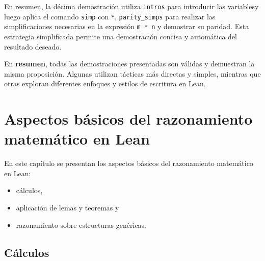 En resumen, la décima demostración utiliza \texttt{intros} para introducir las
variablesy luego aplica el comando \texttt{simp} con \texttt{*}, \texttt{parity\_simps} para
realizar las simplificaciones necesarias en la expresión \texttt{m * n} y
demostrar su paridad. Esta estrategia simplificada permite una
demostración concisa y automática del resultado deseado.

En \textbf{resumen}, todas las demostraciones presentadas son válidas y
demuestran la misma proposición. Algunas utilizan tácticas más directas
y simples, mientras que otras exploran diferentes enfoques y estilos de
escritura en Lean.

\chapter{Aspectos básicos del razonamiento matemático en Lean}
\label{sec:org2d4e1ba}

En este capítulo se presentan los aspectos básicos del razonamiento matemático
en Lean:
\begin{itemize}
\item cálculos,
\item aplicación de lemas y teoremas y
\item razonamiento sobre estructuras genéricas.
\end{itemize}

\section{Cálculos}
\label{sec:org7573cfd}


